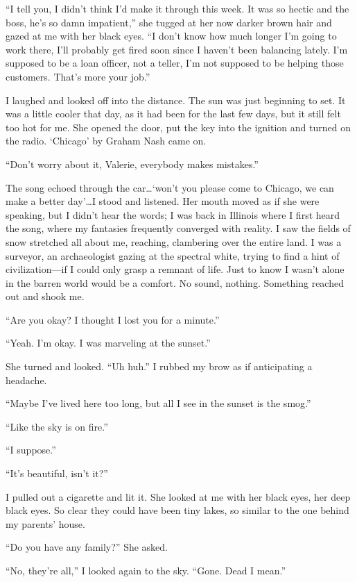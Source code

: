 \documentclass[
]{article}
\begin{document}
``I tell you, I didn't think I'd make it through this week. It was so
hectic and the boss, he's so damn impatient,'' she tugged at her now
darker brown hair and gazed at me with her black eyes. ``I don't know
how much longer I'm going to work there, I'll probably get fired soon
since I haven't been balancing lately. I'm supposed to be a loan
officer, not a teller, I'm not supposed to be helping those customers.
That's more your job.''

I laughed and looked off into the distance. The sun was just beginning
to set. It was a little cooler that day, as it had been for the last few
days, but it still felt too hot for me. She opened the door, put the key
into the ignition and turned on the radio. `Chicago' by Graham Nash came
on.

``Don't worry about it, Valerie, everybody makes mistakes.''

The song echoed through the car\ldots{}`won't you please come to
Chicago, we can make a better day'\ldots I stood and listened. Her mouth
moved as if she were speaking, but I didn't hear the words; I was back
in Illinois where I first heard the song, where my fantasies frequently
converged with reality. I saw the fields of snow stretched all about me,
reaching, clambering over the entire land. I was a surveyor, an
archaeologist gazing at the spectral white, trying to find a hint of
civilization---if I could only grasp a remnant of life. Just to know I
wasn't alone in the barren world would be a comfort. No sound, nothing.
Something reached out and shook me.

``Are you okay? I thought I lost you for a minute.''

``Yeah. I'm okay. I was marveling at the sunset.''

She turned and looked. ``Uh huh.'' I rubbed my brow as if anticipating a
headache.

``Maybe I've lived here too long, but all I see in the sunset is the
smog.''

``Like the sky is on fire.''

``I suppose.''

``It's beautiful, isn't it?''

I pulled out a cigarette and lit it. She looked at me with her black
eyes, her deep black eyes. So clear they could have been tiny lakes, so
similar to the one behind my parents' house.

``Do you have any family?'' She asked.

``No, they're all,'' I looked again to the sky. ``Gone. Dead I mean.''
\end{document}
